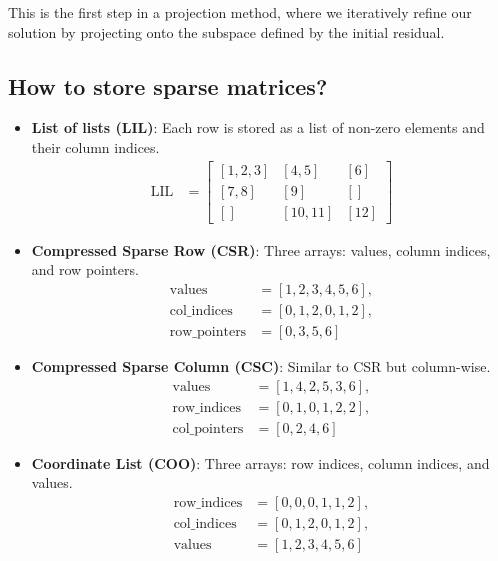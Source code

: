 This is the first step in a projection method, where we iteratively refine our solution by projecting onto the subspace defined by the initial residual.

\subsection{How to store sparse matrices?}

\begin{itemize}
    \item \textbf{List of lists (LIL)}: Each row is stored as a list of non-zero elements and their column indices.
          \begin{align*}
              \text{LIL} & =
              \begin{bmatrix}
                  [1, 2, 3] & [4, 5]   & [6]  \\
                  [7, 8]    & [9]      & []   \\
                  []        & [10, 11] & [12]
              \end{bmatrix}
          \end{align*}
    \item \textbf{Compressed Sparse Row (CSR)}: Three arrays: values, column indices, and row pointers.
          \begin{align*}
              \text{values}        & = [1, 2, 3, 4, 5, 6], \\
              \text{col\_indices}  & = [0, 1, 2, 0, 1, 2], \\
              \text{row\_pointers} & = [0, 3, 5, 6]
          \end{align*}
    \item \textbf{Compressed Sparse Column (CSC)}: Similar to CSR but column-wise.
          \begin{align*}
              \text{values}        & = [1, 4, 2, 5, 3, 6], \\
              \text{row\_indices}  & = [0, 1, 0, 1, 2, 2], \\
              \text{col\_pointers} & = [0, 2, 4, 6]
          \end{align*}
    \item \textbf{Coordinate List (COO)}: Three arrays: row indices, column indices, and values.
          \begin{align*}
              \text{row\_indices} & = [0, 0, 0, 1, 1, 2], \\
              \text{col\_indices} & = [0, 1, 2, 0, 1, 2], \\
              \text{values}       & = [1, 2, 3, 4, 5, 6]
          \end{align*}
\end{itemize}